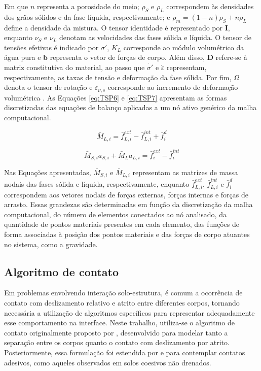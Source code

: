 Em que $n$ representa a porosidade do meio; $\rho_S$ e $\rho_L$ correspondem às densidades dos grãos sólidos e da fase líquida, respectivamente; e $\rho_m = (1-n)\rho_S + n\rho_L$ define a densidade da mistura. O tensor identidade é representado por $\textbf{I}$, enquanto $\nu_S$ e $\nu_L$ denotam as velocidades das fases sólida e líquida. O tensor de tensões efetivas é indicado por $\sigma'$, $K_L$ corresponde ao módulo volumétrico da água pura e $\textbf{b}$ representa o vetor de forças de corpo. Além disso, $\textbf{D}$ refere-se à matriz constitutiva do material, ao passo que $\dot{\sigma'}$ e $\dot{\varepsilon}$ representam, respectivamente, as taxas de tensão e deformação da fase sólida. Por fim, $\Omega$ denota o tensor de rotação e $\varepsilon_{\nu,s}$ corresponde ao incremento de deformação volumétrica \cite{Martinelli2022}. As Equações \ref{eq:TSP6} e \ref{eq:TSP7} apresentam as formas discretizadas das equações de balanço aplicadas a um nó ativo genérico da malha computacional.

\begin{equation}
	\bar{M}_{L,i}=\bar{f}^{ext}_{L,i} - \bar{f}^{int}_{L,i} + \bar{f}^d_i
	\label{eq:TSP6}
\end{equation}

\begin{equation}
	\bar{M}_{S,i}a_{S,i} + \bar{M}_La_{L,i} = \bar{f}^{ext}_i - \bar{f}^{int}_i 
	\label{eq:TSP7}
\end{equation}

Nas Equações apresentadas, $\bar{M}_{S,i}$ e $\bar{M}_{L,i}$ representam as matrizes de massa nodais das fases sólida e líquida, respectivamente, enquanto $\bar{f}^{ext}_{L,i}$, $\bar{f}^{int}_{L,i}$ e $\bar{f}^{d}_i$ correspondem aos vetores nodais de forças externas, forças internas e forças de arrasto. Essas grandezas são determinadas em função da discretização da malha computacional, do número de elementos conectados ao nó analisado, da quantidade de pontos materiais presentes em cada elemento, das funções de forma associadas à posição dos pontos materiais e das forças de corpo atuantes no sistema, como a gravidade.

\subsection{Algoritmo de contato}

Em problemas envolvendo interação solo-estrutura, é comum a ocorrência de contato com deslizamento relativo e atrito entre diferentes corpos, tornando necessária a utilização de algoritmos específicos para representar adequadamente esse comportamento na interface. Neste trabalho, utiliza-se o algoritmo de contato originalmente proposto por , desenvolvido para modelar tanto a separação entre os corpos quanto o contato com deslizamento por atrito. Posteriormente, essa formulação foi estendida por  e  para contemplar contatos adesivos, como aqueles observados em solos coesivos não drenados.

